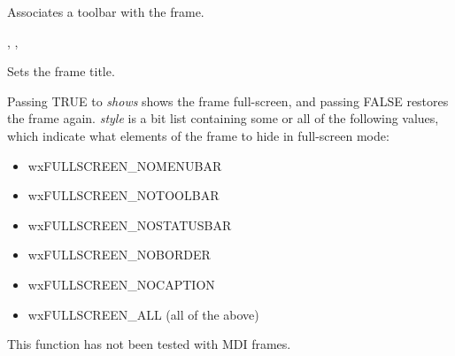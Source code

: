 Associates a toolbar with the frame.


, ,\rtfsp
{}

\label{wxframesettitle}


Sets the frame title.





\label{wxframeshowfullscreen}


Passing TRUE to {\it shows} shows the frame full-screen, and passing FALSE restores the frame
again. {\it style} is a bit list containing some or all of the following values, which
indicate what elements of the frame to hide in full-screen mode:

\begin{itemize}\itemsep=0pt
\item wxFULLSCREEN\_NOMENUBAR
\item wxFULLSCREEN\_NOTOOLBAR
\item wxFULLSCREEN\_NOSTATUSBAR
\item wxFULLSCREEN\_NOBORDER
\item wxFULLSCREEN\_NOCAPTION
\item wxFULLSCREEN\_ALL (all of the above)
\end{itemize}

This function has not been tested with MDI frames.



